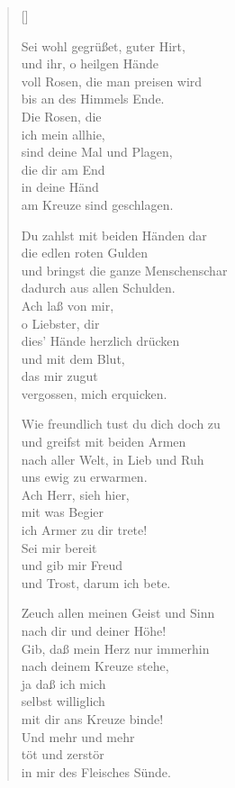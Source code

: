 \begin{multicols}{2}
\settowidth{\versewidth}{Du zahlst mit beiden Händen dar}
\begin{verse}[\versewidth]


 Sei wohl gegrüßet, guter Hirt,\\
und ihr, o heilgen Hände\\
voll Rosen, die man preisen wird\\
bis an des Himmels Ende.\\
Die Rosen, die\\
ich mein allhie,\\
sind deine Mal und Plagen,\\
die dir am End\\
in deine Händ\\
am Kreuze sind geschlagen.

 Du zahlst mit beiden Händen dar\\
die edlen roten Gulden\\
und bringst die ganze Menschenschar\\
dadurch aus allen Schulden.\\
Ach laß von mir,\\
o Liebster, dir\\
dies' Hände herzlich drücken\\
und mit dem Blut,\\
das mir zugut\\
vergossen, mich erquicken.

 Wie freundlich tust du dich doch zu\\
und greifst mit beiden Armen\\
nach aller Welt, in Lieb und Ruh\\
uns ewig zu erwarmen.\\
Ach Herr, sieh hier,\\
mit was Begier\\
ich Armer zu dir trete!\\
Sei mir bereit\\
und gib mir Freud\\
und Trost, darum ich bete.

 Zeuch allen meinen Geist und Sinn\\
nach dir und deiner Höhe!\\
Gib, daß mein Herz nur immerhin\\
nach deinem Kreuze stehe,\\
ja daß ich mich\\
selbst williglich\\
mit dir ans Kreuze binde!\\
Und mehr und mehr\\
töt und zerstör\\
in mir des Fleisches Sünde.

\end{verse}
\end{multicols}

